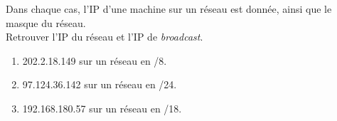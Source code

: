 \documentclass[a4paper,12pt,french]{article}
\begin{document}

\begin{exercice}

Dans chaque cas, l'IP d'une machine sur un réseau est donnée, ainsi que le masque du réseau.\\
Retrouver l'IP du réseau et l'IP de \textit{broadcast}.

\begin{enumerate}[\bfseries 1.]
\item 202.2.18.149 sur un réseau en /8.
\item 97.124.36.142 sur un réseau en /24.
\item 192.168.180.57 sur un réseau en /18.
\end{enumerate}
\end{exercice}
\end{document}
